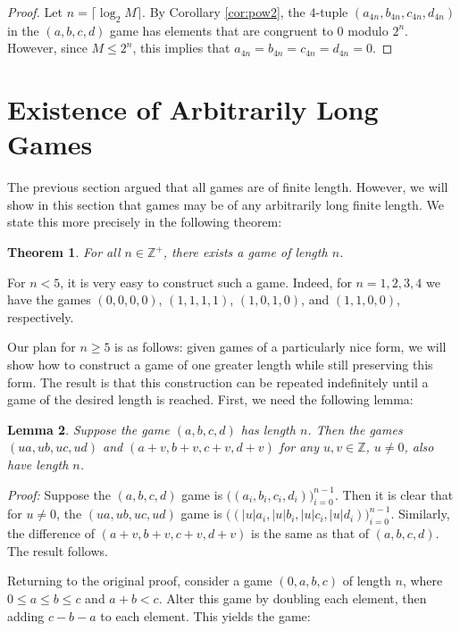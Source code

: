 \documentclass[12pt]{amsart}
\newtheorem{theorem}{Theorem}[section]
\newtheorem{lemma}[theorem]{Lemma}
\newcommand{\zp}{\mathbb{Z}^+}
\begin{document}
\begin{proof}
Let $n = \lceil\log_2{M}\rceil$. By Corollary \ref {cor:pow2}, the $4$-tuple $(a_{4n}, b_{4n}, c_{4n}, d_{4n})$ in the $(a,b,c,d)$ game has elements that are congruent to $0$ modulo $2^n$. However, since $M\leq2^n$, this implies that $a_{4n}=b_{4n}=c_{4n}=d_{4n}=0$.
\end{proof}

\section{Existence of Arbitrarily Long Games\label{sec:longgames}}

The previous section argued that all games are of finite length. However, we will show in this section that games may be of any arbitrarily long finite length. We state this more precisely in the following theorem:

\begin{theorem}
For all $n\in \zp$, there exists a game of length $n$.
\end{theorem}

For $n < 5$, it is very easy to construct such a game. Indeed, for $n=1,2,3,4$ we have the games $(0, 0, 0, 0)$, $(1, 1, 1, 1)$, $(1, 0, 1, 0)$, and $(1, 1, 0, 0)$, respectively.

Our plan for $n \geq 5$ is as follows: given games of a particularly nice form, we will show how to construct a game of one greater length while still preserving this form. The result is that this construction can be repeated indefinitely until a game of the desired length is reached. First, we need the following lemma:

\begin{lemma}
Suppose the game $(a, b, c, d)$ has length $n$. Then the games $(ua, ub, uc, ud)$ and $(a + v, b + v, c + v, d + v)$ for any $u, v\in \mathbb{Z}$, $u\neq 0$, also have length $n$.
\end{lemma}

\textit{Proof:} Suppose the $(a, b, c, d)$ game is $\Big((a_i, b_i, c_i, d_i)\Big)_{i=0}^{n - 1}$. Then it is clear that for $u\neq 0$, the $(ua, ub, uc, ud)$ game is $\Big((|u|a_i, |u|b_i, |u|c_i, |u|d_i)\Big)_{i=0}^{n - 1}$. Similarly, the difference of $(a + v, b + v, c + v, d + v)$ is the same as that of $(a, b, c, d)$. The result follows.

Returning to the original proof, consider a game $(0, a, b, c)$ of length $n$, where $0\leq a\leq b\leq c$ and $a + b < c$. Alter this game by doubling each element, then adding $c - b - a$ to each element. This yields the game:
\end{document}
